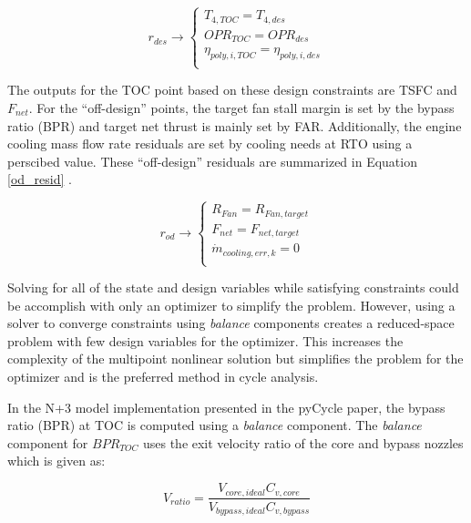 \documentclass[conf]{new-aiaa}
\begin{document}
\begin{equation}
    r_{des} \rightarrow
    \begin{cases}
        T_{4,TOC} = T_{4,des}                 \\
        OPR_{TOC} = OPR_{des}                 \\
        \eta_{poly,i,TOC} = \eta_{poly,i,des} \\
    \end{cases}
    \label{des_resid}
\end{equation}

The outputs for the TOC point based on these design constraints are TSFC and $F_{net}$.
For the ``off-design'' points, the target fan stall margin is set by the bypass ratio (BPR) and target net thrust is mainly set by FAR.
Additionally, the engine cooling mass flow rate residuals are set by cooling needs at RTO using a perscibed value.
These ``off-design'' residuals are summarized in Equation \eqref{od_resid} \cite{Hendricks2019}.

\begin{equation}
    r_{od} \rightarrow
    \begin{cases}
        R_{Fan} = R_{Fan,target}      \\
        F_{net} = F_{net,target}      \\
        \dot{m}_{cooling, err, k} = 0 \\
    \end{cases}
    \label{od_resid}
\end{equation}

Solving for all of the state and design variables while satisfying constraints could be accomplish with only an optimizer to simplify the problem.
However, using a solver to converge constraints using \emph{balance} components creates a reduced-space problem with few design variables for the optimizer.
This increases the complexity of the multipoint nonlinear solution but simplifies the problem for the optimizer and is the preferred method in cycle analysis.

In the N+3 model implementation presented in the pyCycle paper, the bypass ratio (BPR) at TOC is computed using a \emph{balance} component.
The \emph{balance} component for $BPR_{TOC}$ uses the exit velocity ratio of the core and bypass nozzles which is given as:

\begin{equation}
    V_{ratio} = \frac{V_{core,ideal}C_{v,core}}{V_{bypass,ideal}C_{v,bypass}}
    \label{vratio}
\end{equation}
\end{document}
